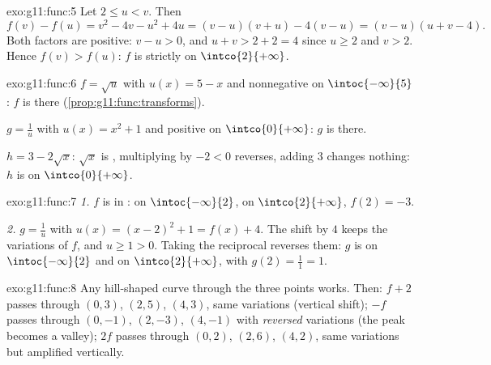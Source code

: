\begin{solution}{exo:g11:func:5}
Let $2 \leq u < v$. Then
\[
f(v) - f(u) = v^2 - 4v - u^2 + 4u = (v-u)(v+u) - 4(v-u)
= (v - u)(u + v - 4).
\]
Both factors are positive: $v - u > 0$, and $u + v > 2 + 2 = 4$ since
$u \geq 2$ and $v > 2$. Hence $f(v) > f(u)$: $f$ is strictly 
on $\intco{2}{+\infty}$.
\end{solution}

\begin{solution}{exo:g11:func:6}
$f = \sqrt{u}$ with $u(x) = 5 - x$  and nonnegative on
$\intoc{-\infty}{5}$: $f$ is  there
(\cref{prop:g11:func:transforms}).

$g = \frac1u$ with $u(x) = x^2 + 1$  and positive on
$\intco{0}{+\infty}$: $g$ is  there.

$h = 3 - 2\sqrt x$: $\sqrt x$ is , multiplying by $-2 < 0$
reverses, adding $3$ changes nothing: $h$ is  on
$\intco{0}{+\infty}$.
\end{solution}

\begin{solution}{exo:g11:func:7}
\emph{1.} $f$ is in :  on $\intoc{-\infty}{2}$,
 on $\intco{2}{+\infty}$,  $f(2) = -3$.

\emph{2.} $g = \frac{1}{u}$ with $u(x) = (x-2)^2 + 1 = f(x) + 4$. The
shift by $4$ keeps the variations of $f$, and $u \geq 1 > 0$. Taking the
reciprocal reverses them: $g$ is  on $\intoc{-\infty}{2}$ and
 on $\intco{2}{+\infty}$, with 
$g(2) = \frac{1}{1} = 1$.
\end{solution}

\begin{solution}{exo:g11:func:8}
Any hill-shaped curve through the three points works. Then:
$f + 2$ passes through $(0,3)$, $(2,5)$, $(4,3)$, same variations
(vertical shift); $-f$ passes through $(0,-1)$, $(2,-3)$, $(4,-1)$ with
\emph{reversed} variations (the peak becomes a valley); $2f$ passes
through $(0,2)$, $(2,6)$, $(4,2)$, same variations but amplified
vertically.
\end{solution}

